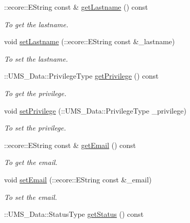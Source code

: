 \begin{DoxyCompactItemize}
::ecore::EString const \& \hyperlink{classUMS__Data_1_1User_a16ff9acaa5a6b8a57ffb5cb4751677f3}{getLastname} () const 
\begin{DoxyCompactList}\small\item\em To get the lastname. \item\end{DoxyCompactList}\item 
void \hyperlink{classUMS__Data_1_1User_afb85e5b27993c28a5bce572c84bc1096}{setLastname} (::ecore::EString const \&\_\-lastname)
\begin{DoxyCompactList}\small\item\em To set the lastname. \item\end{DoxyCompactList}\item 
::UMS\_\-Data::PrivilegeType \hyperlink{classUMS__Data_1_1User_aebc62b71204fba6476545726f4d1e292}{getPrivilege} () const 
\begin{DoxyCompactList}\small\item\em To get the privilege. \item\end{DoxyCompactList}\item 
void \hyperlink{classUMS__Data_1_1User_aab3eff860f4c243e487c4fdaebaaddb8}{setPrivilege} (::UMS\_\-Data::PrivilegeType \_\-privilege)
\begin{DoxyCompactList}\small\item\em To set the privilege. \item\end{DoxyCompactList}\item 
::ecore::EString const \& \hyperlink{classUMS__Data_1_1User_ae309622b933b0cb444bde06dca0a66bd}{getEmail} () const 
\begin{DoxyCompactList}\small\item\em To get the email. \item\end{DoxyCompactList}\item 
void \hyperlink{classUMS__Data_1_1User_a773ff9ffac88747c1b535dc37a27e018}{setEmail} (::ecore::EString const \&\_\-email)
\begin{DoxyCompactList}\small\item\em To set the email. \item\end{DoxyCompactList}\item 
::UMS\_\-Data::StatusType \hyperlink{classUMS__Data_1_1User_a7bba23d05e98f2617279858c7f585e34}{getStatus} () const 

\end{DoxyCompactItemize}
